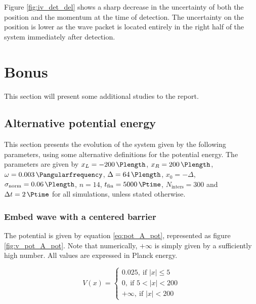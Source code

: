 \documentclass[a4paper,12pt,twoside]{article}
\begin{document}
Figure \ref{fig:iv_det_del} shows a sharp decrease in the uncertainty of both the position and the momentum at the time of detection. The uncertainty on the position is lower as the wave packet is located entirely in the right half of the system immediately after detection.


\newpage
\section{Bonus}
  This section will present some additional studies to the report.\\

  \subsection{Alternative potential energy}
    This section presents the evolution of the system given by the following parameters, using some alternative definitions for the potential energy.
    The parameters are given by $x_L=\SI{-200}{\Plength}$, $x_R=\SI{200}{\Plength}$, $\omega = \SI{0.003}{\Pangularfrequency}$, $\Delta = \SI{64}{\Plength}$, $x_0 = -\Delta$, $\sigma_\text{norm} = \SI{0.06}{\Plength}$, $n=14$, $t_\text{fin} = \SI{5000}{\Ptime}$, $N_\text{inters} = 300$ and $\Delta t = \SI{2}{\Ptime}$ for all simulations, unless stated otherwise.\\

      \subsubsection{Embed wave with a centered barrier}
        The potential is given by equation \eqref{eq:pot_A_pot}, represented as figure \ref{fig:v_pot_A_pot}.
        Note that numerically, $+\infty$ is simply given by a sufficiently high number.
        All values are expressed in Planck energy.

        \begin{equation}
          V(x) =
          \begin{cases}
            0.025,~\text{if $|x| \leq 5$}\\
            0,~\text{if $5 < |x| < 200$}\\
            +\infty,~\text{if $|x| < 200$}
          \end{cases}
          \label{eq:pot_A_pot}
        \end{equation}
\end{document}
